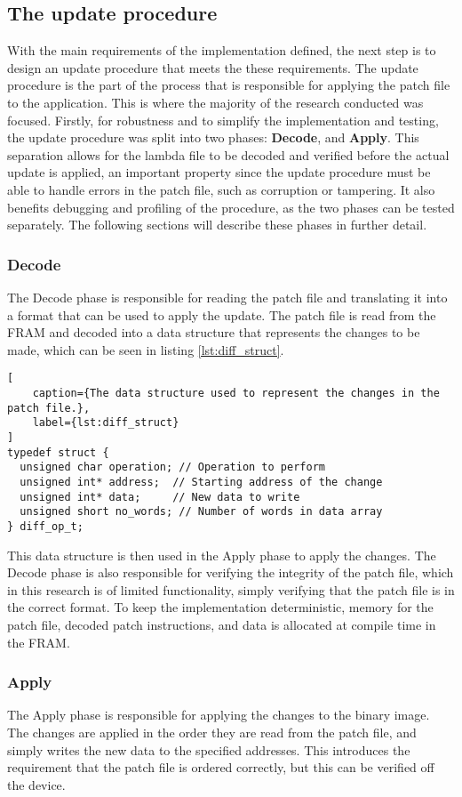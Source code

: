 \subsection{The update procedure}\label{sec:updateprocedure}
With the main requirements of the implementation defined, the next step is to design an update procedure that meets the these requirements. The update procedure is the part of the process that is responsible for applying the patch file to the application. This is where the majority of the research conducted was focused. Firstly, for robustness and to simplify the implementation and testing, the update procedure was split into two phases: \textbf{Decode}, and \textbf{Apply}. This separation allows for the lambda file to be decoded and verified before the actual update is applied, an important property since the update procedure must be able to handle errors in the patch file, such as corruption or tampering. It also benefits debugging and profiling of the procedure, as the two phases can be tested separately. The following sections will describe these phases in further detail. 

\subsubsection*{Decode}
The Decode phase is responsible for reading the patch file and translating it into a format that can be used to apply the update. The patch file is read from the FRAM and decoded into a data structure that represents the changes to be made, which can be seen in listing \ref{lst:diff_struct}. 
\begin{lstlisting}[
    caption={The data structure used to represent the changes in the patch file.},
    label={lst:diff_struct}
]
typedef struct {
  unsigned char operation; // Operation to perform
  unsigned int* address;  // Starting address of the change
  unsigned int* data;     // New data to write
  unsigned short no_words; // Number of words in data array
} diff_op_t;
\end{lstlisting}
This data structure is then used in the Apply phase to apply the changes. The Decode phase is also responsible for verifying the integrity of the patch file, which in this research is of limited functionality, simply verifying that the patch file is in the correct format. To keep the implementation deterministic, memory for the patch file, decoded patch instructions, and data is allocated at compile time in the FRAM.

\subsubsection*{Apply}
The Apply phase is responsible for applying the changes to the binary image. The changes are applied in the order they are read from the patch file, and simply writes the new data to the specified addresses. This introduces the requirement that the patch file is ordered correctly, but this can be verified off the device. 

